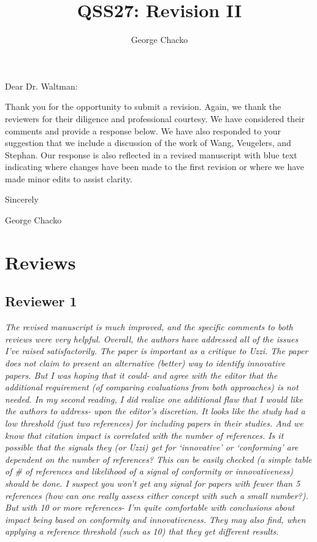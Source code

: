 \documentclass[11pt, oneside]{article}   	%
\title{QSS27: Revision II}
\author{George Chacko}
\begin{document}
\maketitle

Dear Dr. Waltman:

\vspace{5mm}
\raggedright 
Thank you for the opportunity to submit a revision. Again, we thank the reviewers for their diligence and professional courtesy. We have considered their comments and provide a response below. We have also responded to your suggestion that we include a discussion of the work of Wang, Veugelers, and Stephan. Our response is also reflected in a revised manuscript with blue text indicating where changes have been made to the first revision or where we have made minor edits to assist clarity. 

\vspace{3mm}
Sincerely
\vspace{5mm}

George Chacko

\section{Reviews}
\subsection{Reviewer 1}

\emph{The revised manuscript is much improved, and the specific comments to both reviews were very helpful. Overall, the authors have addressed all of the issues I’ve raised satisfactorily. The paper is important as a critique to Uzzi. The paper does not claim to present an alternative (better) way to identify innovative papers.  But I was hoping that it could- and agree with the editor that the additional requirement (of comparing evaluations from both approaches) is not needed. In my second reading, I did realize one additional flaw that I would like the authors to address- upon the editor’s discretion.  It looks like the study had a low threshold (just two references) for including papers in their studies. And we know that citation impact is correlated with the number of references. Is it possible that the signals they (or Uzzi) get for ‘innovative’ or ‘conforming’ are dependent on the number of references? This can be easily checked (a simple table of \# of references and likelihood of a signal of conformity or innovativeness) should be done. I suspect you won’t get any signal for papers with fewer than 5 references (how can one really assess either concept with such a small number?).  But with 10 or more references- I'm quite comfortable with conclusions about impact being based on conformity and innovativeness. They may also find, when applying a reference threshold (such as 10) that they get different results.}
\end{document}

